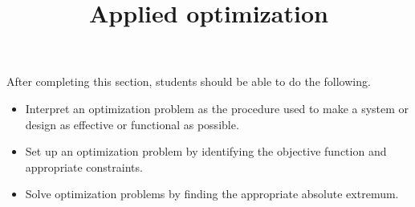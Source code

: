 \documentclass{ximera}
\title{Applied optimization}
\begin{document}
\begin{abstract}
\end{abstract}

\maketitle

\begin{sectionOutcomes}

After completing this section, students should be able to do the following.

\begin{itemize}
	\item Interpret an optimization problem as the procedure used to make a system or design as effective or functional as possible.
	\item Set up an optimization problem by identifying the objective function and appropriate constraints.
	\item Solve optimization problems by finding the appropriate absolute extremum.
\end{itemize}

\end{sectionOutcomes}
\end{document}
